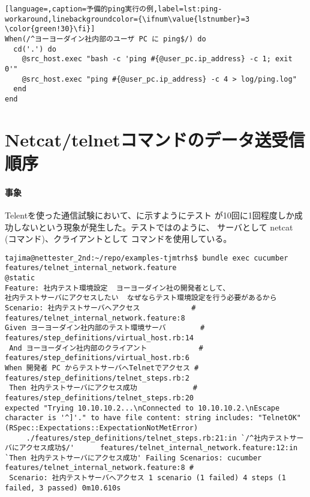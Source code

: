 \begin{lstlisting}[language=,caption=予備的ping実行の例,label=lst:ping-workaround,linebackgroundcolor={\ifnum\value{lstnumber}=3 \color{green!30}\fi}]
When(/^ヨーヨーダイン社内部のユーザ PC に ping$/) do
  cd('.') do
    @src_host.exec "bash -c 'ping #{@user_pc.ip_address} -c 1; exit 0'"
    @src_host.exec "ping #{@user_pc.ip_address} -c 4 > log/ping.log"
  end
end
\end{lstlisting}

 \section{Netcat/telnetコマンドのデータ送受信順序}
 \label{sec:telnet-probrem}

    \paragraph{事象}
Telentを使った通信試験において、に示すようにテスト
が10回に1回程度しか成功しないという現象が発生した。テストではのように、
サーバとして netcat (コマンド)、クライアントとして
 コマンドを使用している。
 
\begin{lstlisting}[caption=Telnetテストシナリオ,label=lst:telnet-bk]
tajima@nettester_2nd:~/repo/examples-tjmtrhs$ bundle exec cucumber features/telnet_internal_network.feature
@static
Feature: 社内テスト環境設定  ヨーヨーダイン社の開発者として、
社内テストサーバにアクセスしたい  なぜならテスト環境設定を行う必要があるから
Scenario: 社内テストサーバへアクセス            # features/telnet_internal_network.feature:8
Given ヨーヨーダイン社内部のテスト環境サーバ        # features/step_definitions/virtual_host.rb:14
 And ヨーヨーダイン社内部のクライアント            # features/step_definitions/virtual_host.rb:6
When 開発者 PC からテストサーバへTelnetでアクセス # features/step_definitions/telnet_steps.rb:2
 Then 社内テストサーバにアクセス成功             # features/step_definitions/telnet_steps.rb:20
expected "Trying 10.10.10.2...\nConnected to 10.10.10.2.\nEscape character is '^]'." to have file content: string includes: "TelnetOK" (RSpec::Expectations::ExpectationNotMetError)
     ./features/step_definitions/telnet_steps.rb:21:in `/^社内テストサーバにアクセス成功$/'      features/telnet_internal_network.feature:12:in `Then 社内テストサーバにアクセス成功' Failing Scenarios: cucumber features/telnet_internal_network.feature:8 #
 Scenario: 社内テストサーバへアクセス 1 scenario (1 failed) 4 steps (1 failed, 3 passed) 0m10.610s
\end{lstlisting}

